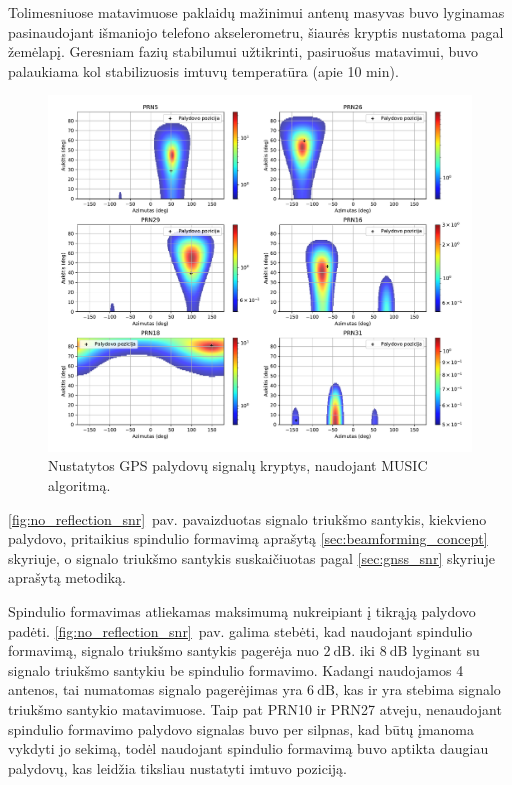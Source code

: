 \documentclass[main.tex]{subfiles}
\begin{document}
Tolimesniuose matavimuose paklaidų mažinimui antenų masyvas buvo lyginamas pa\-si\-nau\-do\-jant
išmaniojo telefono akselerometru, šiaurės kryptis nustatoma pagal žemėlapį.
Geresniam fazių stabilumui užtikrinti, pasiruošus matavimui, buvo palaukiama
kol stabilizuosis imtuvų temperatūra (apie 10 min).

\begin{figure}[ht]
    \begin{centering}
    \includegraphics[scale=0.55]{drawings/no_reflection}
    \par\end{centering}
    \protect\caption{\label{fig:no_reflection}Nustatytos GPS palydovų signalų kryptys, naudojant MUSIC algoritmą.}
\end{figure}

\ref{fig:no_reflection_snr}~pav. pavaizduotas signalo triukšmo santykis, kiekvieno palydovo,
pritaikius spindulio formavimą aprašytą \ref{sec:beamforming_concept} skyriuje, o
signalo triukšmo santykis suskaičiuotas pagal \ref{sec:gnss_snr} skyriuje aprašytą
metodiką.

Spindulio formavimas atliekamas maksimumą nukreipiant į tikrąją palydovo padėti.
\ref{fig:no_reflection_snr}~pav. galima stebėti, kad naudojant spindulio formavimą,
signalo triukšmo santykis pagerėja nuo $2\ \mathrm{dB}$. iki $8\ \mathrm{dB}$ lyginant
su signalo triukšmo santykiu be spindulio formavimo.
Kadangi naudojamos 4 antenos, tai numatomas signalo pagerėjimas yra $6\ \mathrm{dB}$,
kas ir yra stebima signalo triukšmo santykio matavimuose. Taip pat PRN10 ir PRN27 atveju,
nenaudojant spindulio formavimo palydovo signalas buvo per silpnas, kad būtų
įmanoma vykdyti jo sekimą, todėl naudojant spindulio formavimą buvo aptikta
daugiau palydovų, kas leidžia tiksliau nustatyti imtuvo poziciją.
\end{document}
